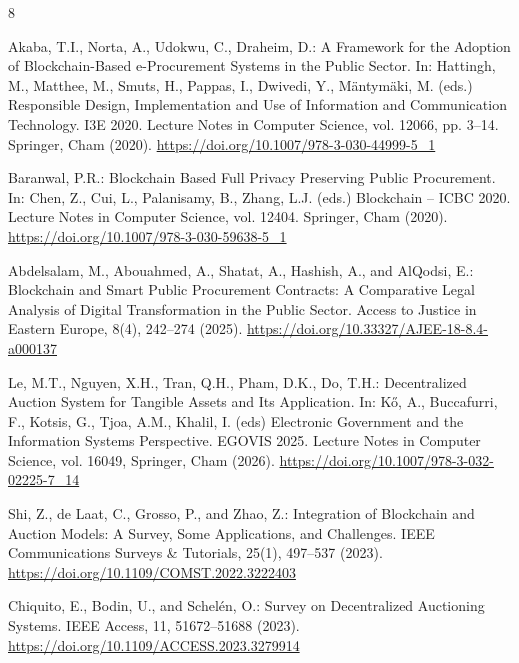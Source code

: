 \documentclass[runningheads]{llncs}
\begin{document}
%
%
%
% 
% 
%
\begin{thebibliography}{8}


Akaba, T.I., Norta, A., Udokwu, C., Draheim, D.:
A Framework for the Adoption of Blockchain-Based e-Procurement Systems in the Public Sector.
In: Hattingh, M., Matthee, M., Smuts, H., Pappas, I., Dwivedi, Y., Mäntymäki, M. (eds.)
Responsible Design, Implementation and Use of Information and Communication Technology.
I3E 2020. Lecture Notes in Computer Science, vol. 12066, pp. 3--14.
Springer, Cham (2020).
\url{https://doi.org/10.1007/978-3-030-44999-5_1}

Baranwal, P.R.:
Blockchain Based Full Privacy Preserving Public Procurement.
In: Chen, Z., Cui, L., Palanisamy, B., Zhang, L.J. (eds.)
Blockchain -- ICBC 2020.
Lecture Notes in Computer Science, vol. 12404.
Springer, Cham (2020).
\url{https://doi.org/10.1007/978-3-030-59638-5_1}

Abdelsalam, M., Abouahmed, A., Shatat, A., Hashish, A., and AlQodsi, E.:
Blockchain and Smart Public Procurement Contracts: A Comparative Legal Analysis of Digital Transformation in the Public Sector.
Access to Justice in Eastern Europe, 8(4), 242--274 (2025).
\url{https://doi.org/10.33327/AJEE-18-8.4-a000137}

Le, M.T., Nguyen, X.H., Tran, Q.H., Pham, D.K., Do, T.H.:
Decentralized Auction System for Tangible Assets and Its Application.
In: Kő, A., Buccafurri, F., Kotsis, G., Tjoa, A.M., Khalil, I. (eds)
Electronic Government and the Information Systems Perspective. EGOVIS 2025.
Lecture Notes in Computer Science, vol. 16049, Springer, Cham (2026).
\url{https://doi.org/10.1007/978-3-032-02225-7_14}

Shi, Z., de Laat, C., Grosso, P., and Zhao, Z.:
Integration of Blockchain and Auction Models: A Survey, Some Applications, and Challenges.
IEEE Communications Surveys \& Tutorials, 25(1), 497--537 (2023).
\url{https://doi.org/10.1109/COMST.2022.3222403}

Chiquito, E., Bodin, U., and Schelén, O.:
Survey on Decentralized Auctioning Systems.
IEEE Access, 11, 51672--51688 (2023).
\url{https://doi.org/10.1109/ACCESS.2023.3279914}


\end{thebibliography}
\end{document}
